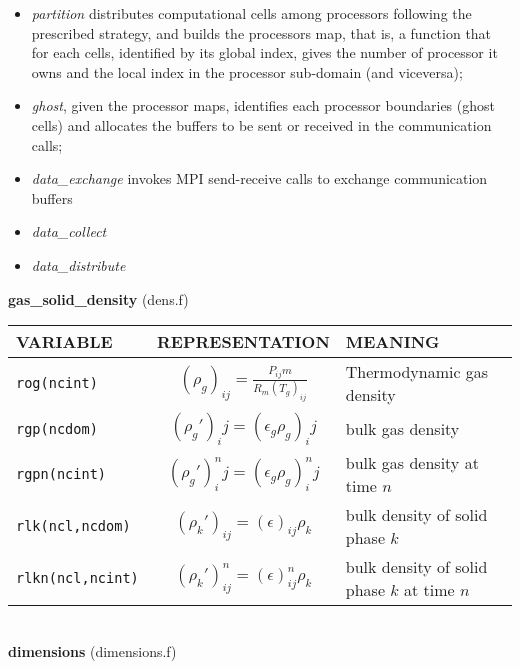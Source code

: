\begin{itemize}
\item{\em partition} distributes computational cells among processors following the 
prescribed strategy, and builds the processors map, that is, a function that
 for each cells, identified by its global index, gives the number of 
processor it owns and the local index in the processor sub-domain (and viceversa);\\
\item{\em ghost}, given the processor maps, identifies each processor boundaries 
(ghost cells) and
allocates the buffers to be sent or received in the communication calls;\\
\item{\em data\_exchange} invokes MPI send-receive calls to exchange communication 
 buffers \\
\item{\em data\_collect} 
\item{\em data\_distribute} 
\end{itemize}
%
%
{\large {\bf gas\_solid\_density}} (dens.f)\\[5mm]
\begin{tabular}{|p{6cm}|c|p{6cm}|}\hline
VARIABLE & REPRESENTATION & MEANING\\\hline
\tt rog(ncint) & $(\rho_g)_{ij}=\frac{P_{ij}m}{R_m(T_g)_{ij}}$ &  Thermodynamic gas density \\\hline
\tt rgp(ncdom) & $(\rho_g')_ij=(\epsilon_g\rho_g)_ij $&  bulk gas density \\\hline
\tt rgpn(ncint) & $(\rho_g')^{n}_ij=(\epsilon_g\rho_g)^{n}_ij $&  bulk gas density at time $n$ \\\hline
\tt rlk(ncl,ncdom) & $(\rho_k')_{ij}=(\epsilon)_{ij}\rho_k$ &  bulk density of solid phase $k$ \\\hline
\tt rlkn(ncl,ncint) & $(\rho_k')^{n}_{ij}=(\epsilon)^{n}_{ij}\rho_k$ &  bulk density of solid phase $k$ at time $n$\\\hline
\end{tabular}\\[5mm]
%
%
{\large {\bf dimensions}} (dimensions.f)\\[5mm]
